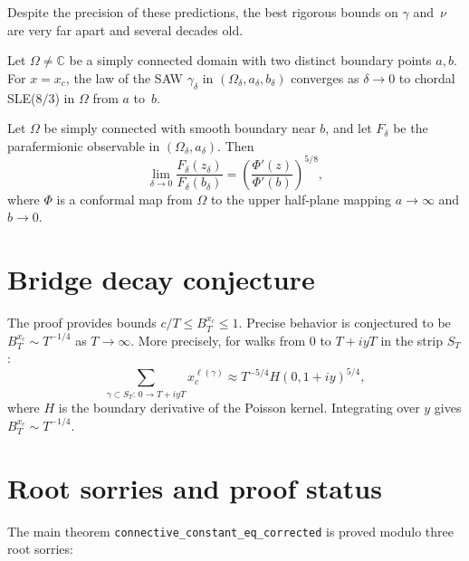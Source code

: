\begin{lemma}
\begin{enumerate}
Despite the precision of these predictions, the best rigorous bounds on
$\gamma$ and~$\nu$ are very far apart and several decades old.

\begin{conjecture}\label{conj:SLE}
\leanok
{}
  Let $\Omega \neq \mathbb{C}$ be a simply connected domain with two
  distinct boundary points $a, b$. For $x = x_c$, the law of the SAW
  $\gamma_\delta$ in $(\Omega_\delta, a_\delta, b_\delta)$ converges as
  $\delta \to 0$ to chordal SLE($8/3$) in $\Omega$ from $a$ to~$b$.
\end{conjecture}

\begin{conjecture}\label{conj:observable_limit}
  Let $\Omega$ be simply connected with smooth boundary near $b$,
  and let $F_\delta$ be the parafermionic observable in
  $(\Omega_\delta, a_\delta)$. Then
  \[
    \lim_{\delta \to 0} \frac{F_\delta(z_\delta)}{F_\delta(b_\delta)}
    = \left(\frac{\Phi'(z)}{\Phi'(b)}\right)^{5/8},
  \]
  where $\Phi$ is a conformal map from $\Omega$ to the upper half-plane
  mapping $a \to \infty$ and $b \to 0$.
\end{conjecture}

\section{Bridge decay conjecture}

\begin{remark}\label{rem:bridge-decay-conj}
  The proof provides bounds $c/T \leq B_T^{x_c} \leq 1$.
  Precise behavior is conjectured to be $B_T^{x_c} \sim T^{-1/4}$
  as $T \to \infty$. More precisely, for walks from $0$ to $T + iyT$
  in the strip $S_T$:
  \[
    \sum_{\gamma \subset S_T :\, 0 \to T + iyT} x_c^{\ell(\gamma)}
    \approx T^{-5/4} H(0, 1 + iy)^{5/4},
  \]
  where $H$ is the boundary derivative of the Poisson kernel.
  Integrating over $y$ gives $B_T^{x_c} \sim T^{-1/4}$.
\end{remark}

\section{Root sorries and proof status}

The main theorem \texttt{connective\_constant\_eq\_corrected}
is proved modulo three root sorries:


\end{enumerate}
\end{lemma}
